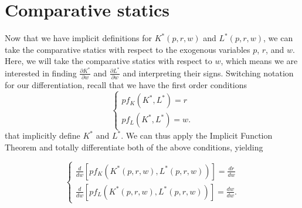 \section{Comparative statics}

Now that we have implicit definitions for $K^*(p, r, w)$ and $L^*(p, r, w)$, we can take the comparative statics with respect to the exogenous variables $p$, $r$, and $w$. Here, we will take the comparative statics with respect to $w$, which means we are interested in finding $\frac{\partial K^*}{\partial w}$ and $\frac{\partial L^*}{\partial w}$ and interpreting their signs. Switching notation for our differentiation, recall that we have the first order conditions
$$\begin{cases}
p f_K\left(K^{*}, L^{*}\right) = r \\
p f_L\left(K^{*}, L^{*}\right) = w.
\end{cases}$$
that implicitly define $K^*$ and $L^*$. We can thus apply the Implicit Function Theorem and totally differentiate both of the above conditions, yielding

$$\begin{cases}
\frac{d}{d w}\left[p f_{K}\left(K^{*}(p, r, w), L^{*}(p, r, w)\right)\right]=\frac{d r}{d w} \\
\frac{d}{d w}\left[p f_{L}\left(K^{*}(p, r, w), L^{*}(p, r, w)\right)\right]=\frac{d w}{d w}.
\end{cases}$$

